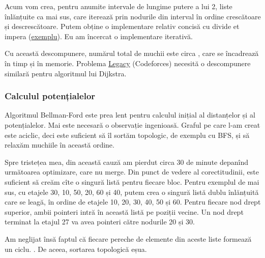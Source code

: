 \documentclass[../main.tex]{subfiles}
\begin{document}
Acum vom crea, pentru anumite intervale de lungime putere a lui 2, liste înlănțuite ca mai sus, care iterează prin nodurile din interval în ordine crescătoare și descrescătoare. Putem obține o implementare relativ concisă cu divide et impera (\href{https://kilonova.ro/submissions/6180}{exemplu}). Eu am încercat o implementare iterativă.

Cu această descompunere, numărul total de muchii este circa , care se încadrează în timp și în memorie. Problema \href{https://codeforces.com/contest/786/problem/B}{Legacy} (Codeforces) necesită o descompunere similară pentru algoritmul lui Dijkstra.


\subsubsection*{Calculul potențialelor}

Algoritmul Bellman-Ford este prea lent pentru calculul inițial al distanțelor și al potențialelor. Mai este necesară o observație ingenioasă. Graful pe care l-am creat este aciclic, deci este suficient să îl sortăm topologic, de exemplu cu BFS, și să relaxăm muchiile în această ordine.

Spre tristețea mea, din această cauză am pierdut circa 30 de minute depanînd următoarea optimizare, care nu merge. Din punct de vedere al corectitudinii, este suficient să creăm cîte o singură listă pentru fiecare bloc. Pentru exemplul de mai sus, cu etajele  30, 10, 50, 20, 60 și 40, putem crea o singură listă dublu înlănțuită care se leagă, în ordine de etajele 10, 20, 30, 40, 50 și 60. Pentru fiecare nod drept superior, ambii pointeri intră în această listă pe poziții vecine. Un nod drept terminat la etajul 27 va avea pointeri către nodurile 20 și 30.

Am neglijat însă faptul că fiecare pereche de elemente din aceste liste formează un ciclu. . De aceea, sortarea topologică eșua.
\end{document}
